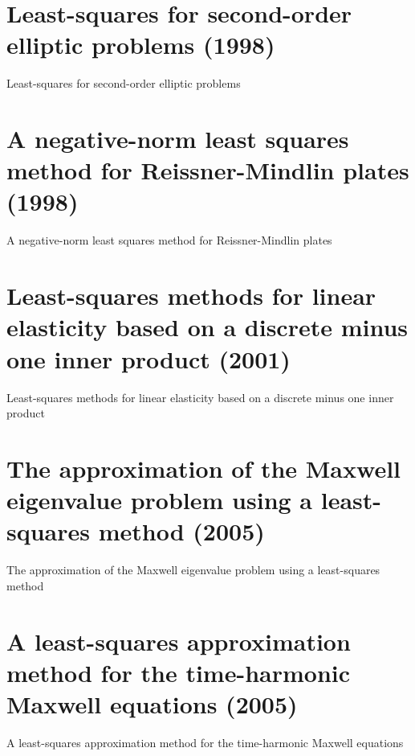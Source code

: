 \section{Least-squares for second-order elliptic problems (1998)}
Least-squares for second-order elliptic problems \cite{bramble1998least}



\section{A negative-norm least squares method for Reissner-Mindlin plates (1998)}
A negative-norm least squares method for Reissner-Mindlin plates \cite{bramble1998negative}



\section{Least-squares methods for linear elasticity based on a discrete minus one inner product (2001)}
Least-squares methods for linear elasticity based on a discrete minus one inner product \cite{bramble2001least}



\section{The approximation of the Maxwell eigenvalue problem using a least-squares method (2005)}
The approximation of the Maxwell eigenvalue problem using a least-squares method \cite{bramble2005approximation}



\section{A least-squares approximation method for the time-harmonic Maxwell equations (2005)}
A least-squares approximation method for the time-harmonic Maxwell equations \cite{bramble2005least}



